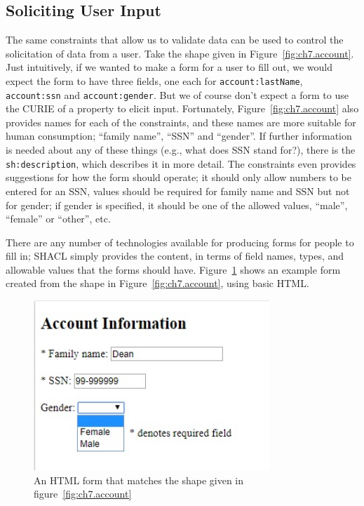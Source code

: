 \subsection{Soliciting User Input}\label{soliciting}

The same constraints that allow us to validate data can be used to
control the solicitation of data from a user.  Take the shape given in
Figure~\ref{fig:ch7.account}.  Just intuitively, if we wanted to make
a form for a user to fill out, we would expect the form to have three
fields, one each for \texttt{account:lastName}, \texttt{account:ssn}
and \texttt{account:gender}.  But we of course don't expect a form to
use the CURIE of a property to elicit input.  Fortunately,
Figure~\ref{fig:ch7.account} also provides names for each of the
constraints, and these names are more suitable for human consumption;
``family name'', ``SSN'' and ``gender''.  If further information is
needed about any of these things (e.g., what does SSN stand for?),
there is the \texttt{sh:description}, which describes it in more
detail.  The constraints even
provides suggestions for how the form should operate; it should only 
allow numbers to be entered for an SSN, values should be required for family name
and SSN but not for gender; if gender is specified, it  should be one of the allowed values, 
``male'', ``female'' or ``other'', etc. 

There are any number of technologies available for producing forms for
people to fill in; SHACL simply provides the content, in terms of
field names, types, and allowable values that the forms should have.
Figure~\ref{fig:ch7.form} shows an example form created from the shape
in Figure~\ref{fig:ch7.account}, using basic HTML.

\begin{figure}
    \centering
    \includegraphics[width=3.5in]{SWWOv3/media/ch7/figure-07-form.jpg}
    \caption{An HTML form that matches the shape given in figure~\protect\ref{fig:ch7.account}}
    \label{fig:ch7.form}
\end{figure}


